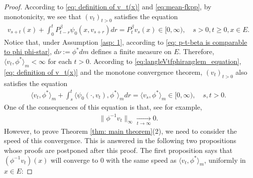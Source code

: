 \documentclass[12pt,a4paper]{amsart}
\theoremstyle{definition}
\numberwithin{equation}{section}
\begin{document}
\begin{proof}
  According to \eqref{eq: definition of v_t(x)} and \eqref{eq:mean-fkpp}, by monotonicity, we see that $(v_t)_{t > 0}$ satisfies the equation
  \begin{align}
    v_{s+t}(x) + \int_0^t P^\beta_{t-r} \psi_0(x,v_{s+r}) dr
    = P^\beta_t v_s(x)
    \in [0,\infty),
    \quad s>0, t \geq 0,x \in E.
  \end{align}
  Notice that, under Assumption \ref{asp: 1}, according to \eqref{eq: p-t-beta is comparable to phi phi-star}, $d\nu:= \phi^* dm$ defines a finite measure on $E$.
  Therefore, $\langle v_t, \phi^*\rangle_m < \infty$ for each $t>0$.
  According to \eqref{eq:langleVtfphiranglem_equation}, \eqref{eq: definition of v_t(x)} and the monotone convergence theorem, $(v_t)_{t> 0}$ also satisfies the equation
  \begin{align}
    \label{eq: equation of <vt,phi>}
    \langle v_t,\phi^*\rangle_m + \int_s^t \langle \psi_0(\cdot ,v_t) , \phi^*\rangle_m dr
    = \langle v_s,\phi^*\rangle_m
    \in [0,\infty),
    \quad s, t > 0.
  \end{align}
  One of the consequences of this equation is that, see \cite[Lemma 5.2]{RenSongSun2017Spine} for example,
  \begin{align}
    \label{eq: uniform converges to 0}
    \|\phi^{-1}v_t\|_{\infty} \xrightarrow[t\to \infty]{} 0.
  \end{align}
  However, to prove Theorem \ref{thm: main theorem}(2), we need to consider the speed of this convergence.
  This is answered in the following two propositions whose proofs are postponed after this proof.
  The first proposition says that $(\phi^{-1}v_t)(x)$ will converge to $0$ with the same speed as $\langle v_t,\phi^*\rangle_m$, uniformly in $x\in E$:


\end{proof}
\end{document}
